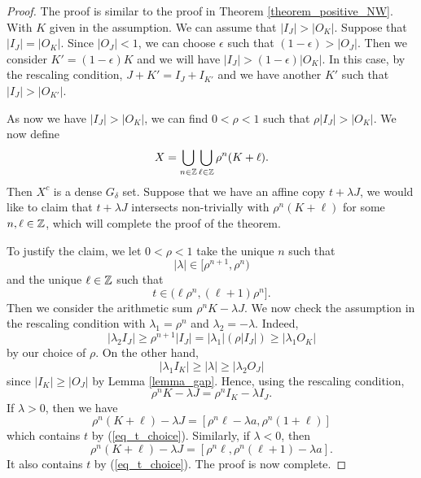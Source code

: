\begin{proof}
The proof is similar to the proof in Theorem  \ref{theorem_positive_NW}. With $K$ given in the assumption. We can assume that $|I_J|>|O_K|$. Suppose that $|I_J| = |O_K|$. Since $|O_J|<1$, we can choose $\epsilon$ such that $(1-\epsilon) > |O_J|.$  Then we consider $K' = (1-\epsilon)K$ and we will have $|I_J|> (1-\epsilon)|O_K|$. In this case, by the rescaling condition,  $J+K' = I_J+I_{K'}$ and we have another $K'$ such that $|I_J|>|O_{K'}|$.  

\medskip

As now we have $|I_J|>|O_K|$, we can find $0<\rho<1$ such that $\rho |I_J| > |O_K|$. We now define  
$$
X = \bigcup_{n\in{\mathbb Z}}\bigcup_{\ell\in\mathbb{Z}} \rho^n (K+\ell). 
$$
Then $X^c$ is a  dense $G_{\delta}$ set. Suppose that we have an affine copy $t+\lambda J$, we would like to claim that $t+\lambda J$ intersects non-trivially   with $\rho^n (K+\ell)$ for some $n,\ell\in \mathbb{Z}$, which will complete the proof of the theorem. 

\medskip


To justify the claim, we let $0<\rho<1$ take the unique $n$ such that 
\begin{equation}\label{eq_lambda_choice}
    |\lambda| \in [\rho^{n+1}, \rho^{n})
\end{equation}
and the  unique $\ell\in\mathbb{Z}$ such that 
\begin{equation}\label{eq_t_choice}
t \in (\ell  \rho^n, (\ell+1)\rho^n].    
\end{equation}
Then we consider the arithmetic sum $\rho^n K-\lambda J$. We now check the assumption in  the rescaling condition with $\lambda_1=\rho^n$ and  $\lambda_2 = -\lambda$. Indeed,
$$
|\lambda_2 I_J| \ge \rho^{n+1}|I_J| = |\lambda_1| (\rho |I_J|) \ge  |\lambda_1 O_K| 
$$
by our choice of $\rho$. On the other hand, 
$$
|\lambda_1 I_K| \ge |\lambda|\ge |\lambda_2 O_J|
$$
since $|I_K|\ge |O_J|$ by Lemma \ref{lemma_gap}. Hence, using the rescaling condition, 
$$
\rho^n K -\lambda J= \rho^n I_K-\lambda I_J. 
$$
If $\lambda>0$, then we have 
$$
\rho^n (K+\ell) -\lambda J = [\rho^n\ell-\lambda a, \rho^n(1+\ell)]
$$
which contains $t$ by (\ref{eq_t_choice}). Similarly, if $\lambda<0$, then 
$$
\rho^n (K+\ell) -\lambda J = [\rho^n\ell,\rho^n(\ell+1)-\lambda a].
$$
It also contains $t$ by (\ref{eq_t_choice}). The proof is now complete. 
\end{proof}

